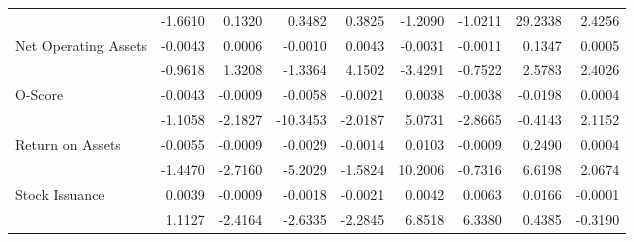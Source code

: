 \begin{sidewaystable}[htbp]
\begin{tabular}{@{}lrrrrrrrr@{}}
& -1.6610 & 0.1320 & 0.3482 & 0.3825 & -1.2090 & -1.0211 & 29.2338 & 2.4256 \\
\multirow{2}{*}{Net Operating Assets} & -0.0043 & 0.0006 & -0.0010 & 0.0043 & -0.0031 & -0.0011 & 0.1347 & 0.0005 \\
& -0.9618 & 1.3208 & -1.3364 & 4.1502 & -3.4291 & -0.7522 & 2.5783 & 2.4026 \\
\multirow{2}{*}{O-Score} & -0.0043 & -0.0009 & -0.0058 & -0.0021 & 0.0038 & -0.0038 & -0.0198 & 0.0004 \\
& -1.1058 & -2.1827 & -10.3453 & -2.0187 & 5.0731 & -2.8665 & -0.4143 & 2.1152 \\
\multirow{2}{*}{Return on Assets} & -0.0055 & -0.0009 & -0.0029 & -0.0014 & 0.0103 & -0.0009 & 0.2490 & 0.0004 \\
& -1.4470 & -2.7160 & -5.2029 & -1.5824 & 10.2006 & -0.7316 & 6.6198 & 2.0674 \\
\multirow{2}{*}{Stock Issuance} & 0.0039 & -0.0009 & -0.0018 & -0.0021 & 0.0042 & 0.0063 & 0.0166 & -0.0001 \\
& 1.1127 & -2.4164 & -2.6335 & -2.2845 & 6.8518 & 6.3380 & 0.4385 & -0.3190 \\ \bottomrule
\end{tabular}%
\end{sidewaystable}
